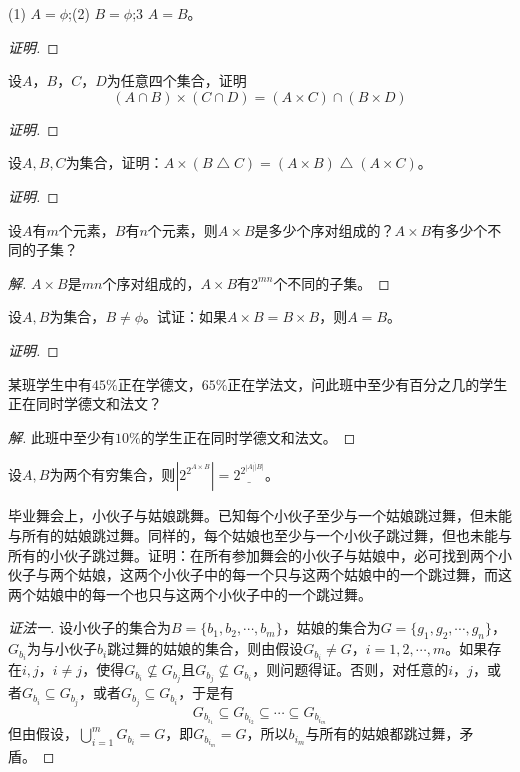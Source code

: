 \documentclass{article}
\begin{document}
\begin{CJK}{UTF8}{gbsn}
\begin{Exercise}
  (1) $A=\phi$;(2) $B=\phi$;3 $A=B$。
\end{Exercise}
\begin{proof}[证明]
\end{proof}
\begin{Exercise}
  设$A$，$B$，$C$，$D$为任意四个集合，证明
  \[(A\cap B) \times (C \cap D) = (A\times C)\cap (B \times D)\]
\end{Exercise}
\begin{proof}[证明]
\end{proof}
\begin{Exercise}
  设$A,B,C$为集合，证明：$A\times(B\bigtriangleup C) = (A\times B)\bigtriangleup(A\times C)$。
\end{Exercise}
\begin{proof}[证明]
\end{proof}
\begin{Exercise}
  设$A$有$m$个元素，$B$有$n$个元素，则$A\times B$是多少个序对组成的？$A\times B$有多少个不同的子集？
\end{Exercise}
\begin{proof}[解]
  $A\times B$是$mn$个序对组成的，$A\times B$有$2^{mn}$个不同的子集。
\end{proof}
\begin{Exercise}
  设$A,B$为集合，$B\neq \phi$。试证：如果$A\times B= B\times B$，则$A=B$。
\end{Exercise}
\begin{proof}[证明]
\end{proof}
\begin{Exercise}
  某班学生中有$45\%$正在学德文，$65\%$正在学法文，问此班中至少有百分之几的学生正在同时学德文和法文？
\end{Exercise}
\begin{proof}[解]
  此班中至少有$10\%$的学生正在同时学德文和法文。
\end{proof}
\begin{Exercise}
  设$A,B$为两个有穷集合，则$|2^{2^{A\times B}}|=\underline{2^{2^{|A|\dot|B|}}}$。
\end{Exercise}

\begin{Exercise}
  毕业舞会上，小伙子与姑娘跳舞。已知每个小伙子至少与一个姑娘跳过舞，但未能与所有的姑娘跳过舞。同样的，每个姑娘也至少与一个小伙子跳过舞，但也未能与所有的小伙子跳过舞。证明：在所有参加舞会的小伙子与姑娘中，必可找到两个小伙子与两个姑娘，这两个小伙子中的每一个只与这两个姑娘中的一个跳过舞，而这两个姑娘中的每一个也只与这两个小伙子中的一个跳过舞。
\end{Exercise}
\begin{proof}[证法一]设小伙子的集合为$B=\{b_1,b_2,\cdots,b_m\}$，姑娘的集合为$G=\{g_1,g_2,\cdots,g_n\}$， $G_{b_i}$为与小伙子$b_i$跳过舞的姑娘的集合，则由假设$G_{b_i}\neq G$，$i=1,2,\cdots,m$。如果存在$i, j$，$i \neq j$，使得$G_{b_i}\nsubseteq G_{b_j}$且$G_{b_j}\nsubseteq G_{b_i}$，则问题得证。否则，对任意的$i$，$j$，或者$G_{b_i}\subseteq G_{b_j}$，或者$G_{b_j}\subseteq G_{b_i}$，于是有\[G_{b_{i_1}}\subseteq G_{b_{i_2}}\subseteq \cdots \subseteq G_{b_{i_m}}\]但由假设，$\bigcup_{i=1}^mG_{b_i} = G$，即$G_{b_{i_m}}=G$，所以$b_{i_m}$与所有的姑娘都跳过舞，矛盾。
  

\end{proof}
\end{CJK}
\end{document}
